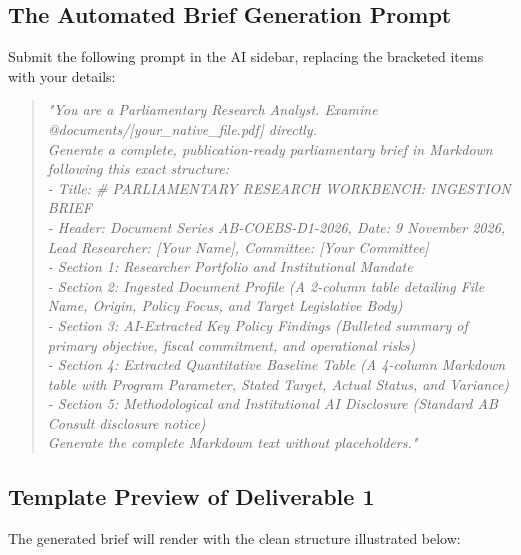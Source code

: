 \documentclass[11pt, a4paper]{report}
\begin{document}
\subsection{The Automated Brief Generation Prompt}
Submit the following prompt in the AI sidebar, replacing the bracketed items with your details:
\begin{quote}
\small
\textit{"You are a Parliamentary Research Analyst. Examine @documents/[your\_native\_file.pdf] directly. \\
Generate a complete, publication-ready parliamentary brief in Markdown following this exact structure: \\
- Title: \# PARLIAMENTARY RESEARCH WORKBENCH: INGESTION BRIEF \\
- Header: Document Series AB-COEBS-D1-2026, Date: 9 November 2026, Lead Researcher: [Your Name], Committee: [Your Committee] \\
- Section 1: Researcher Portfolio and Institutional Mandate \\
- Section 2: Ingested Document Profile (A 2-column table detailing File Name, Origin, Policy Focus, and Target Legislative Body) \\
- Section 3: AI-Extracted Key Policy Findings (Bulleted summary of primary objective, fiscal commitment, and operational risks) \\
- Section 4: Extracted Quantitative Baseline Table (A 4-column Markdown table with Program Parameter, Stated Target, Actual Status, and Variance) \\
- Section 5: Methodological and Institutional AI Disclosure (Standard AB Consult disclosure notice) \\
Generate the complete Markdown text without placeholders."}
\end{quote}

\subsection{Template Preview of Deliverable 1}
The generated brief will render with the clean structure illustrated below:
\end{document}
